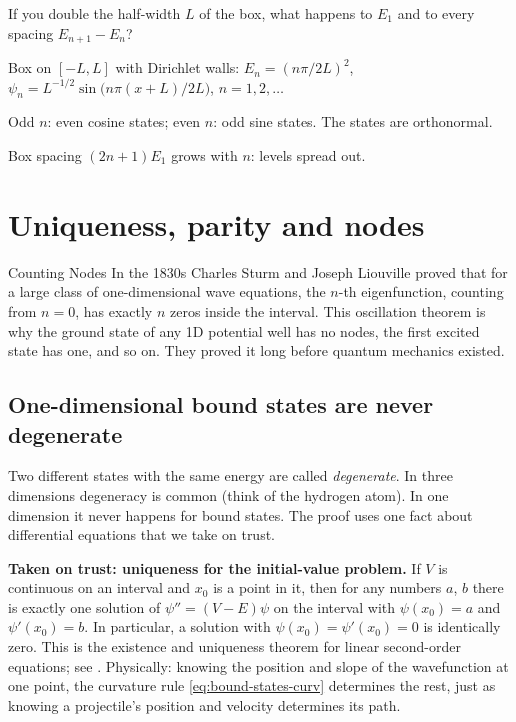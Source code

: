 \begin{checkpoint}
If you double the half-width $L$ of the box, what happens to $E_1$ and to every spacing $E_{n+1}-E_n$?
\end{checkpoint}

\begin{keyideas}
\item Box on $[-L,L]$ with Dirichlet walls: $E_n=(n\pi/2L)^2$, $\psi_n=L^{-1/2}\sin\bigl(n\pi(x+L)/2L\bigr)$, $n=1,2,\dots$
\item Odd $n$: even cosine states; even $n$: odd sine states. The states are orthonormal.
\item Box spacing $(2n+1)E_1$ grows with $n$: levels spread out.
\end{keyideas}

\section{Uniqueness, parity and nodes}\label{sec:bound-states-parity}
\begin{didyouknow}{Counting Nodes}
In the 1830s Charles Sturm and Joseph Liouville proved that for a large class of one-dimensional wave equations, the $n$-th eigenfunction, counting from $n=0$, has exactly $n$ zeros inside the interval. This oscillation theorem is why the ground state of any 1D potential well has no nodes, the first excited state has one, and so on. They proved it long before quantum mechanics existed.
\end{didyouknow}

\subsection{One-dimensional bound states are never degenerate}

Two different states with the same energy are called \emph{degenerate}. In three dimensions degeneracy is common (think of the hydrogen atom). In one dimension it never happens for bound states. The proof uses one fact about differential equations that we take on trust.

\begin{beyond}
\textbf{Taken on trust: uniqueness for the initial-value problem.} If $V$ is continuous on an interval and $x_0$ is a point in it, then for any numbers $a$, $b$ there is exactly one solution of $\psi''=(V-E)\psi$ on the interval with $\psi(x_0)=a$ and $\psi'(x_0)=b$. In particular, a solution with $\psi(x_0)=\psi'(x_0)=0$ is identically zero. This is the existence and uniqueness theorem for linear second-order equations; see \cite{rhb}. Physically: knowing the position and slope of the wavefunction at one point, the curvature rule \cref{eq:bound-states-curv} determines the rest, just as knowing a projectile's position and velocity determines its path.
\end{beyond}

